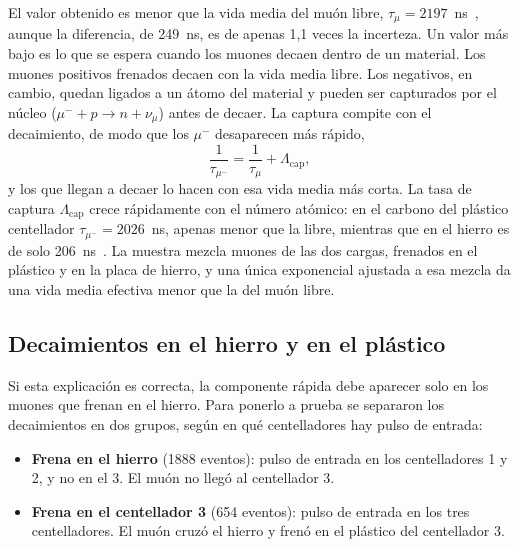 El valor obtenido es menor que la vida media del muón libre,
$\tau_\mu = 2197$~ns~\cite{pdg}, aunque la diferencia, de 249~ns, es de apenas
1{,}1 veces la incerteza. Un valor más bajo es lo que se espera cuando los muones
decaen dentro de un material. Los muones positivos frenados decaen con la vida
media libre. Los negativos, en cambio, quedan ligados a un átomo del material y
pueden ser capturados por el núcleo ($\mu^- + p \to n + \nu_\mu$) antes de decaer.
La captura compite con el decaimiento, de modo que los $\mu^-$ desaparecen más
rápido,
\begin{equation}
    \frac{1}{\tau_{\mu^-}} = \frac{1}{\tau_\mu} + \Lambda_\text{cap} ,
\end{equation}
y los que llegan a decaer lo hacen con esa vida media más corta. La tasa de captura
$\Lambda_\text{cap}$ crece rápidamente con el número atómico: en el carbono del
plástico centellador $\tau_{\mu^-} = 2026$~ns, apenas menor que la libre, mientras
que en el hierro es de solo 206~ns~\cite{suzuki}. La muestra mezcla muones de las
dos cargas, frenados en el plástico y en la placa de hierro, y una única
exponencial ajustada a esa mezcla da una vida media efectiva menor que la del muón
libre.

\subsection{Decaimientos en el hierro y en el plástico}

Si esta explicación es correcta, la componente rápida debe aparecer solo en los
muones que frenan en el hierro. Para ponerlo a prueba se separaron los
decaimientos en dos grupos, según en qué centelladores hay pulso de entrada:
\begin{itemize}
    \item \textbf{Frena en el hierro} (1888 eventos): pulso de entrada en los
    centelladores 1 y 2, y no en el 3. El muón no llegó al centellador 3.
    \item \textbf{Frena en el centellador 3} (654 eventos): pulso de entrada en los
    tres centelladores. El muón cruzó el hierro y frenó en el plástico del
    centellador 3.
\end{itemize}

